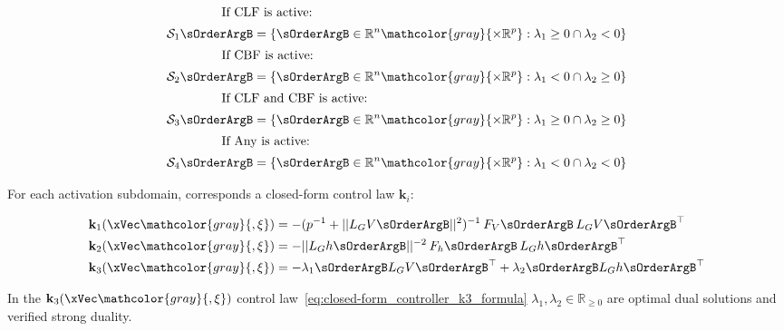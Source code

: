 \begin{align}
    \intertext{\hspace{4em} If CLF is active: }
    \mathcal{S}_1 \sOrderArgB = \{ \sOrderArgB \in \mathbb{R}^n \mathcolor{gray}{\times \mathbb{R}^p}: \lambda_1 \geq 0 \cap \lambda_2 < 0 \}
    \label{eq:Constraints_Activation_Subdomain_1} \\
    \intertext{\hspace{4em} If CBF is active:}
    \mathcal{S}_2 \sOrderArgB = \{ \sOrderArgB \in \mathbb{R}^n \mathcolor{gray}{\times \mathbb{R}^p}: \lambda_1 < 0 \cap \lambda_2 \geq 0 \}
    \label{eq:Constraints_Activation_Subdomain_2} \\
    \intertext{\hspace{4em} If CLF and CBF is active:}
    \mathcal{S}_3 \sOrderArgB = \{ \sOrderArgB \in \mathbb{R}^n \mathcolor{gray}{\times \mathbb{R}^p}: \lambda_1 \geq 0 \cap \lambda_2 \geq 0 \}
    \label{eq:Constraints_Activation_Subdomain_3} \\
    \intertext{\hspace{4em} If Any is active:}
    \mathcal{S}_4\sOrderArgB = \{ \sOrderArgB \in \mathbb{R}^n \mathcolor{gray}{\times \mathbb{R}^p}: \lambda_1 < 0 \cap \lambda_2 < 0 \}
    \label{eq:Constraints_Activation_Subdomain_4} 
\end{align}


For each activation subdomain, corresponds a closed-form control law \(\mathbf{k}_i\):

\begin{align}
    &\mathbf{k}_1(\xVec \mathcolor{gray}{, \mathbf{\xi}}) = -(p^{-1} + ||L_GV \sOrderArgB||^2)^{-1} \hspace{0.2em} F_V\sOrderArgB \hspace{0.2em} L_GV\sOrderArgB^{\top} \label{eq:closed-form_controller_k1_formula} \\ 
    &\mathbf{k}_2(\xVec \mathcolor{gray}{, \mathbf{\xi}}) = -||L_Gh \sOrderArgB||^{-2} \hspace{0.2em} F_h \sOrderArgB \hspace{0.2em} L_Gh \sOrderArgB^{\top}  \label{eq:closed-form_controller_k2_formula}\\ 
    &\mathbf{k}_3(\xVec \mathcolor{gray}{, \mathbf{\xi}}) = -\lambda_1\sOrderArgB L_GV \sOrderArgB^{\top} + \lambda_2\sOrderArgB L_Gh \sOrderArgB^{\top} \label{eq:closed-form_controller_k3_formula}
\end{align}

In the \(\mathbf{k}_3(\xVec \mathcolor{gray}{, \mathbf{\xi}})\) control law~\ref{eq:closed-form_controller_k3_formula} \(\lambda_1, \lambda_2 \in \mathbb{R}_{\geq 0}\) are optimal dual solutions and verified strong duality. 

